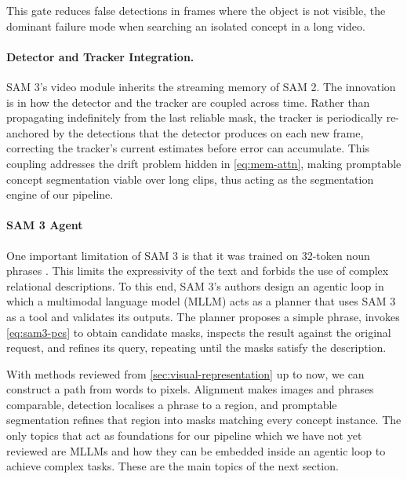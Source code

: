 \noindent This gate reduces false detections in frames where the object is not visible,
the dominant failure mode when searching an isolated concept in a long video.

\paragraph{Detector and Tracker Integration.} SAM 3's video module inherits the streaming
memory of SAM 2. The innovation is in how the detector and the tracker are coupled
across time. Rather than propagating indefinitely from the last reliable mask, the tracker is periodically re-anchored by the detections that the detector produces on each new frame, correcting the tracker's current estimates before error can accumulate. This coupling addresses the drift problem hidden in \cref{eq:mem-attn}, making promptable concept segmentation viable over long clips, thus acting as the segmentation engine of our pipeline.

\paragraph{SAM 3 Agent} One important limitation of SAM 3 is that it was trained on 32-token noun phrases \cite{ravi2025sam3}. This limits the expressivity of the text and forbids the use of complex relational descriptions. To this end, SAM 3's authors design an agentic loop in which a multimodal language model (MLLM) acts as a planner that uses SAM 3 as a tool and validates its outputs. The planner proposes a simple phrase, invokes \cref{eq:sam3-pcs} to obtain candidate masks, inspects the result against the original request, and refines its query, repeating until the masks satisfy the description. 

With methods reviewed from \cref{sec:visual-representation} up to now, we can construct a path from words to pixels. Alignment makes images and phrases comparable, detection localises a phrase to a region, and promptable segmentation refines that region into masks matching every concept instance. The only topics that act as foundations for our pipeline which we have not yet reviewed are MLLMs and how they can be embedded inside an agentic loop to achieve complex tasks. These are the main topics of the next section.
